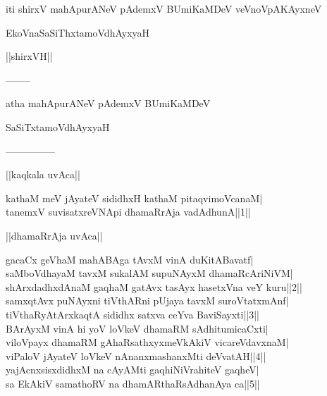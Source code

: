 \documentclass{article}
\begin{document}
\begin{center}
iti shirxV mahApurANeV pAdemxV BUmiKaMDeV veVnoVpAKAyxneV
\end{center}

\begin{center}
EkoVnaSaSiThxtamoVdhAyxyaH
\end{center}

\begin{center}
||shirxVH||
\end{center}

\begin{center}
--------
\end{center}

\begin{center}
atha mahApurANeV pAdemxV BUmiKaMDeV
\end{center}

\begin{center}
SaSiTxtamoVdhAyxyaH
\end{center}

\begin{center}

---------------
\end{center}

\begin{center}
||kaqkala uvAca||
\end{center}

kathaM meV jAyateV sididhxH kathaM pitaqvimoVcanaM|\\
tanemxV suvisatxreVNApi dhamaRrAja vadAdhunA||1||\\

\begin{center}
||dhamaRrAja uvAca||
\end{center}

gacaCx geVhaM mahABAga tAvxM vinA duKitABavatf|\\
saMboVdhayaM tavxM sukalAM supuNAyxM dhamaRcAriNiVM|\\
shArxdadhxdAnaM gaqhaM gatAvx tasAyx hasetxVna veY kuru||2||\\
samxqtAvx puNAyxni tiVthARni pUjaya tavxM suroVtatxmAnf|\\
tiVthaRyAtArxkaqtA sididhx satxva ceYva BaviSayxti||3||\\
BArAyxM vinA hi yoV loVkeV dhamaRM sAdhitumicaCxti|\\
viloVpayx dhamaRM gAhaRsathxyxmeVkAkiV vicareVdavxnaM|\\
viPaloV jAyateV loVkeV nAnanxmashanxMti deVvatAH||4||\\
yajAcnxsisxdidhxM na cAyAMti gaqhiNiVrahiteV gaqheV|\\
sa EkAkiV samathoRV na dhamARthaRsAdhanAya ca||5||\\
\end{document}
